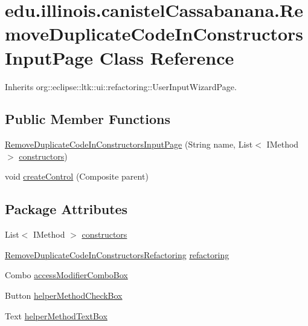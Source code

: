 \hypertarget{classedu_1_1illinois_1_1canistelCassabanana_1_1RemoveDuplicateCodeInConstructorsInputPage}{
\section{edu.illinois.canistelCassabanana.RemoveDuplicateCodeInConstructorsInputPage Class Reference}
\label{classedu_1_1illinois_1_1canistelCassabanana_1_1RemoveDuplicateCodeInConstructorsInputPage}
}


Inherits org::eclipse::ltk::ui::refactoring::UserInputWizardPage.

\subsection*{Public Member Functions}
\begin{DoxyCompactItemize}
\item 
\hyperlink{classedu_1_1illinois_1_1canistelCassabanana_1_1RemoveDuplicateCodeInConstructorsInputPage_a948970b751b4ec66157662eab46a2c0d}{RemoveDuplicateCodeInConstructorsInputPage} (String name, List$<$ IMethod $>$ \hyperlink{classedu_1_1illinois_1_1canistelCassabanana_1_1RemoveDuplicateCodeInConstructorsInputPage_acdcd523154c691ec0083de31b628b54d}{constructors})
\item 
void \hyperlink{classedu_1_1illinois_1_1canistelCassabanana_1_1RemoveDuplicateCodeInConstructorsInputPage_a49d2739e45f9245f1a2bce6922688172}{createControl} (Composite parent)
\end{DoxyCompactItemize}
\subsection*{Package Attributes}
\begin{DoxyCompactItemize}
\item 
List$<$ IMethod $>$ \hyperlink{classedu_1_1illinois_1_1canistelCassabanana_1_1RemoveDuplicateCodeInConstructorsInputPage_acdcd523154c691ec0083de31b628b54d}{constructors}
\item 
\hyperlink{classedu_1_1illinois_1_1canistelCassabanana_1_1RemoveDuplicateCodeInConstructorsRefactoring}{RemoveDuplicateCodeInConstructorsRefactoring} \hyperlink{classedu_1_1illinois_1_1canistelCassabanana_1_1RemoveDuplicateCodeInConstructorsInputPage_a70db3718069b9b46170f0cc912086da2}{refactoring}
\item 
Combo \hyperlink{classedu_1_1illinois_1_1canistelCassabanana_1_1RemoveDuplicateCodeInConstructorsInputPage_ad900b2c0bfbdbac5a701b3e5834f1962}{accessModifierComboBox}
\item 
Button \hyperlink{classedu_1_1illinois_1_1canistelCassabanana_1_1RemoveDuplicateCodeInConstructorsInputPage_ae4b00020b66a4de901af986961ea91e4}{helperMethodCheckBox}
\item 
Text \hyperlink{classedu_1_1illinois_1_1canistelCassabanana_1_1RemoveDuplicateCodeInConstructorsInputPage_a55a3b8c570da15f43d270768908aeab3}{helperMethodTextBox}
\end{DoxyCompactItemize}
